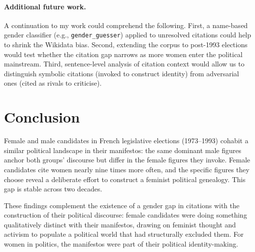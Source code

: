 \documentclass{article}
\begin{document}
\paragraph{Additional future work.}
A continuation to my work could comprehend the following. First, a name-based gender classifier (e.g., \texttt{gender\_guesser}) applied to unresolved citations could help to shrink the Wikidata bias. Second, extending the corpus to post-1993 elections would test whether the citation gap narrows as more women enter the political mainstream. Third, sentence-level analysis of citation context would allow us to distinguish symbolic citations (invoked to construct identity) from adversarial ones (cited as rivals to criticise).

\section{Conclusion}

Female and male candidates in French legislative elections (1973--1993) cohabit a similar political landscape in their manifestos: the same dominant male figures anchor both groups' discourse but differ in the female figures they invoke. Female candidates cite women nearly nine times more often, and the specific figures they choose reveal a deliberate effort to construct a feminist political genealogy. This gap is stable across two decades.

These findings complement the existence of a gender gap in citations with the construction of their political discourse: female candidates were doing something qualitatively distinct with their manifestos, drawing on feminist thought and activism to populate a political world that had structurally excluded them. For women in politics, the manifestos were part of their political identity-making.

                                                       
 

\appendix

%
\end{document}
